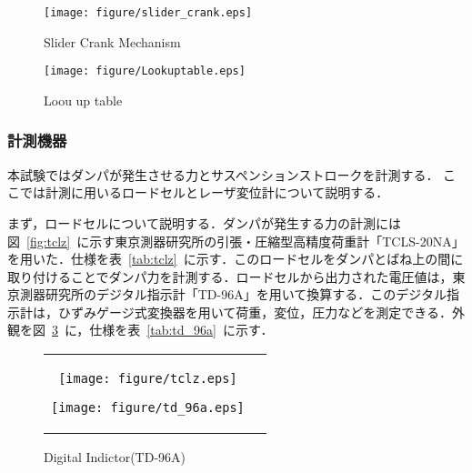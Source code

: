 \documentclass[a4paper,12pt]{article_vdlab_sotsuron}
\begin{document}
\vspace*{5mm}
\begin{figure}[htp]
  \begin{center}
    \texttt{[image: figure/slider\_crank.eps]}
    \vspace*{3mm}
    \caption{Slider Crank Mechanism}
    \label{fig:slider_crank}
  \end{center}
\end{figure}
\vspace*{5mm}
\begin{figure}[htp]
  \begin{center}
    \texttt{[image: figure/Lookuptable.eps]}
    \vspace*{3mm}
    \caption{Loou up table}
    \label{fig:Look}
  \end{center}
\end{figure}

\newpage
\subsubsection{計測機器}
本試験ではダンパが発生させる力とサスペンションストロークを計測する．
ここでは計測に用いるロードセルとレーザ変位計について説明する．
\par
まず，ロードセルについて説明する．ダンパが発生する力の計測には図~\ref{fig:tclz}~に示す東京測器研究所の引張・圧縮型高精度荷重計「TCLS-20NA」を用いた．仕様を表~\ref{tab:tclz}~に示す．このロードセルをダンパとばね上の間に取り付けることでダンパ力を計測する．ロードセルから出力された電圧値は，東京測器研究所のデジタル指示計「TD-96A」を用いて換算する．このデジタル指示計は，ひずみゲージ式変換器を用いて荷重，変位，圧力などを測定できる．外観を図~\ref{fig:td_96a}~に，仕様を表~\ref{tab:td_96a}~に示す．

\vspace*{10mm}
\begin{figure}[h!]
  \begin{tabular}{cc}
  \begin{minipage}{0.5\hsize}
  \begin{center}
    \texttt{[image: figure/tclz.eps]}
      \vspace*{3mm}
      \caption{Loadcell(TCLZ-20NA)}
      \label{fig:tclz}
    \end{center}
  \end{minipage}
  \begin{minipage}{0.5\hsize}
     \begin{center}
      \texttt{[image: figure/td\_96a.eps]}
      \vspace*{3mm}
      \caption{Digital Indictor(TD-96A)}
      \label{fig:td_96a}
    \end{center}
  \end{minipage}
  \end{tabular}
 \end{figure}
\end{document}
